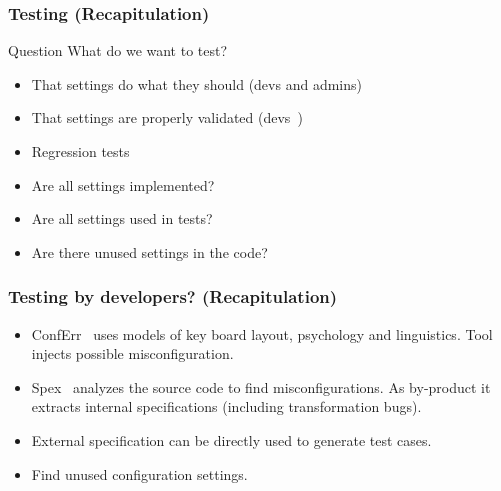 \begin{frame}
	\frametitle{Testing (Recapitulation)}
	\begin{alertblock}{Question}
	What do we want to test?
	\end{alertblock}

	\pause

	\begin{itemize}
	\item That settings do what they should (devs and admins)
	\item That settings are properly validated (devs~\cite{xu2013blame})
	\item Regression tests~\cite{qu2008configuration}
	\pause
	\vspace{1em}
	\item Are all settings implemented?
	\item Are all settings used in tests?
	\item Are there unused settings in the code?
	\end{itemize}
\end{frame}

\begin{frame}
	\frametitle{Testing by developers? (Recapitulation)}

	\pause

	\begin{itemize}[<+-| alert@+>]
	\item ConfErr~\cite{keller2008conferr} uses models of key board layout, psychology and linguistics.
	Tool injects possible misconfiguration.
	\item Spex~\cite{xu2013blame} analyzes the source code to find misconfigurations.
	As by-product it extracts internal specifications (including transformation bugs).
	\item External specification can be directly used to generate test cases.
	\item Find unused configuration settings.
	\end{itemize}
\end{frame}

